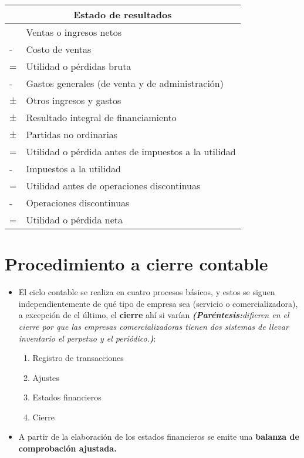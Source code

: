 \documentclass{article}
\begin{document}
\begin{center}
\begin{tabular}{ | p{0.5cm} | p{9cm} | }
 \hline
 \multicolumn{2}{|c|}{Estado de resultados}\\
 \hline
 &  Ventas o ingresos netos \\ 
 \hline
 - & Costo de ventas \\ 
 \hline
 = & Utilidad o pérdidas bruta \\ 
 \hline
 - & Gastos generales (de venta y de administración) \\ 
 \hline
 $\pm$ & Otros ingresos y gastos\\
 \hline
 $\pm$ & Resultado integral de financiamiento \\ 
 \hline
 $\pm $ & Partidas no ordinarias \\ 
 \hline
 = & Utilidad o pérdida antes de impuestos a la utilidad \\ 
 \hline
 - & Impuestos a la utilidad \\ 
 \hline
= & Utilidad antes de operaciones discontinuas \\ 
\hline
- & Operaciones discontinuas \\ 
\hline
= & Utilidad o pérdida neta \\ 
\hline 
\end{tabular}
\end{center}


\section{Procedimiento a cierre contable}
\begin{itemize}
    \item El ciclo contable se realiza en cuatro procesos básicos, y estos se siguen independientemente de qué tipo de empresa sea (servicio o comercializadora), a excepción de el último, el \textbf{cierre} ahí si varían \emph{\textbf{(Paréntesis:}difieren en el cierre por que las empresas comercializadoras tienen dos sistemas de llevar inventario el perpetuo y el periódico.\textbf{)}}: 
    \begin{enumerate}
        \item Registro de transacciones 
        \item Ajustes 
        \item Estados financieros 
        \item Cierre 
    \end{enumerate}
    
    \item A partir de la elaboración de los estados financieros se emite una \textbf{balanza de comprobación ajustada.}
\end{itemize}
\end{document}
